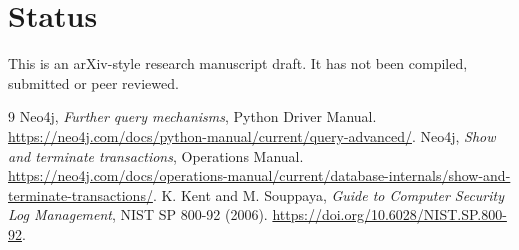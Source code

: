 \documentclass[11pt]{article}
\begin{document}
\section{Status}
This is an arXiv-style research manuscript draft. It has not been compiled, submitted or peer reviewed.
\begin{thebibliography}{9}
 Neo4j, \emph{Further query mechanisms}, Python Driver Manual. \url{https://neo4j.com/docs/python-manual/current/query-advanced/}.
 Neo4j, \emph{Show and terminate transactions}, Operations Manual. \url{https://neo4j.com/docs/operations-manual/current/database-internals/show-and-terminate-transactions/}.
 K. Kent and M. Souppaya, \emph{Guide to Computer Security Log Management}, NIST SP 800-92 (2006). \url{https://doi.org/10.6028/NIST.SP.800-92}.
\end{thebibliography}
\end{document}
